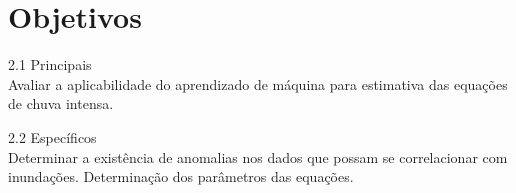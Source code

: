 \chapter{Objetivos}

2.1	Principais\\
Avaliar a aplicabilidade do aprendizado de máquina para estimativa das equações de chuva intensa.

2.2	Específicos \\
Determinar a existência de anomalias nos dados que possam se correlacionar com inundações.
Determinação dos parâmetros das equações.
